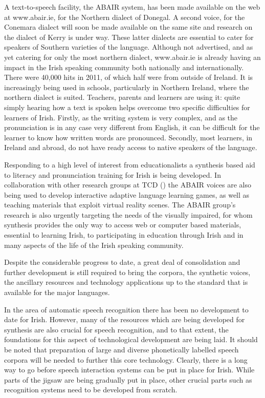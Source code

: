 \begin{multicols}{2}
A text-to-speech facility, the ABAIR system, has been made available on the web at www.abair.ie, for the Northern dialect of Donegal. A second voice, for the Conemara dialect will soon be made available on the same site and research on the dialect of Kerry is under way. These latter dialects are essential to cater for speakers of Southern varieties of the language.  
Although not advertised, and as yet catering for only the most northern dialect, www.abair.ie is already having an impact in the Irish speaking community both nationally and internationally. There were 40,000 hits in 2011, of which half were from outside of Ireland. It is increasingly being used in schools, particularly in Northern Ireland, where the northern dialect is suited. Teachers, parents and learners are using it: quite simply hearing how a text is spoken helps overcome two specific difficulties for learners of Irish. Firstly, as the writing system is very complex, and as the pronunciation is in any case very different from English, it can be difficult for the learner to know how written words are pronounced. Secondly, most learners, in Ireland and abroad, do not have ready access to native speakers of the language. 

Responding to a high level of interest from educationalists a synthesis based aid to literacy and pronunciation training for Irish is being developed. In collaboration with other research groups at TCD (\cite{slate2011}) the ABAIR voices are also being used to develop interactive adaptive language learning games, as well as teaching materials that exploit virtual reality scenes. The ABAIR group’s research is also urgently targeting the needs of the visually impaired, for whom synthesis provides the only way to access web or computer based materials, essential to learning Irish, to participating in education through Irish and in many aspects of the life of the Irish speaking community.

Despite the considerable progress to date, a great deal of consolidation and further development is still required to bring the corpora, the synthetic voices, the ancillary resources and technology applications up to the standard that is available for the major languages.

In the area of automatic speech recognition there has been no development to date for Irish. However, many of the resources which are being developed for synthesis are also crucial for speech recognition, and to that extent, the foundations for this aspect of technological development are being laid. It should be noted that preparation of large and diverse phonetically labelled speech corpora will be needed to further this core technology. Clearly, there is a long way to go before speech interaction systems can be put in place for Irish. While parts of the jigsaw are being gradually put in place, other crucial parts such as recognition systems need to be developed from scratch.


\end{multicols}
